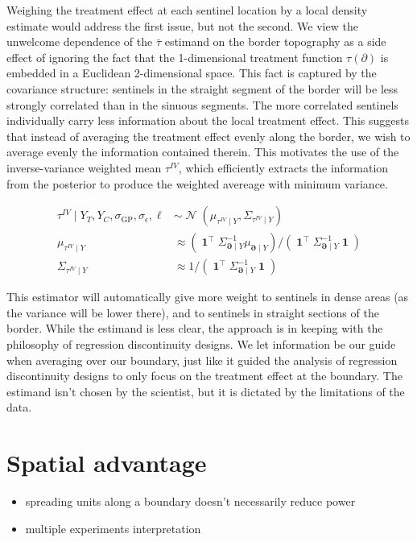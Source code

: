 \documentclass[letter]{article}
\providecommand{\tightlist}{%
      \setlength{\itemsep}{0pt}\setlength{\parskip}{0pt}}
\newcommand{\genericdel}[3]{%
      \left#1#3\right#2
    }
\newcommand{\del}[1]{\genericdel(){#1}}
\DeclareMathOperator{\normal}{\mathcal{N}}
\DeclareMathOperator{\ones}{\mathbf{1}}
\newcommand{\trans}{^{\intercal}}
\newcommand{\sigmaf}{\sigma_{\mathrm{GP}}}
\newcommand{\sigman}{\sigma_{\epsilon}}
\newcommand{\boundary}{\partial}
\newcommand{\sentinels}{\bm{\boundary}}
\newcommand{\linavg}{\bar{\tau}}
\newcommand{\invvar}{\tau^{IV}}
\providecommand{\tightlist}{%
  	  \setlength{\itemsep}{0pt}\setlength{\parskip}{0pt}}
\begin{document}
Weighing the treatment effect at each sentinel location by a local
density estimate would address the first issue, but not the second. We
view the unwelcome dependence of the \(\linavg\) estimand on the border
topography as a side effect of ignoring the fact that the 1-dimensional
treatment function \(\tau(\boundary)\) is embedded in a Euclidean
2-dimensional space. This fact is captured by the covariance structure:
sentinels in the straight segment of the border will be less strongly
correlated than in the sinuous segments. The more correlated sentinels
individually carry less information about the local treatment effect.
This suggests that instead of averaging the treatment effect evenly
along the border, we wish to average evenly the information contained
therein. This motivates the use of the inverse-variance weighted mean
\(\invvar\), which efficiently extracts the information from the
posterior to produce the weighted avereage with minimum variance.

\begin{align}
    \invvar \mid Y_T, Y_C, \sigmaf, \sigman, \ell &\sim \normal\del{\mu_{\invvar \mid Y}, \Sigma_{\invvar \mid Y}} \\
    \mu_{\invvar \mid Y} &\approx \del{\ones\trans \Sigma_{\sentinels \mid Y}^{-1} \mu_{\sentinels \mid Y}} \big/ \del{\ones\trans \Sigma_{\sentinels \mid Y}^{-1} \ones}  \\
    \Sigma_{\invvar \mid Y} &\approx 1 \big/ \del{\ones\trans \Sigma_{\sentinels \mid Y}^{-1} \ones} 
    \label{eq:invvar}
\end{align}

This estimator will automatically give more weight to sentinels in dense
areas (as the variance will be lower there), and to sentinels in
straight sections of the border. While the estimand is less clear, the
approach is in keeping with the philosophy of regression discontinuity
designs. We let information be our guide when averaging over our
boundary, just like it guided the analysis of regression discontinuity
designs to only focus on the treatment effect at the boundary. The
estimand isn't chosen by the scientist, but it is dictated by the
limitations of the data.
    


    	\section{Spatial advantage}\label{spatial-advantage}

\begin{itemize}
\tightlist
\item
  spreading units along a boundary doesn't necessarily reduce power
\item
  multiple experiments interpretation
\end{itemize}
\end{document}
